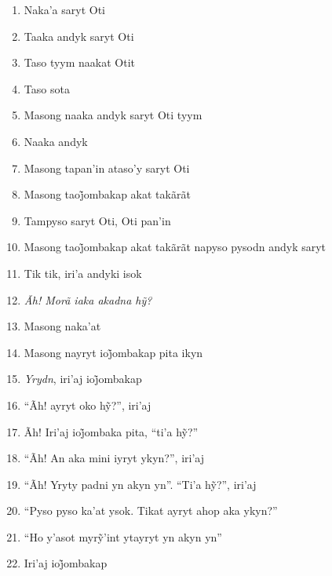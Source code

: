 \begin{enumerate}
 \item Naka'a saryt Oti
 \item Taaka andyk saryt Oti
 \item Taso tyym naakat Otit
 \item Taso sota

 \begin{center}\end{center}
 
 \item Masong naaka andyk saryt Oti tyym
 \item Naaka andyk
 \item Masong tapan'in ataso'y saryt Oti
 \item Masong taoj̃ombakap akat takãrãt
 \item Tampyso saryt Oti, Oti pan'in

 \begin{center}\end{center}

 \item Masong taoj̃ombakap akat takãrãt napyso pysodn andyk saryt
 \item Tik tik, iri'a andyki isok
 \item \textit{Ãh! Morã iaka akadna hỹ?}
 \item Masong naka'at
 \item Masong nayryt ioj̃ombakap pita ikyn
 \item \textit{Yrydn}, iri’aj ioj̃ombakap
 \item ``Ãh! ayryt oko hỹ?'', iri’aj

 \begin{center}\end{center}

 \item Ãh! Iri’aj ioj̃ombaka pita, ``ti’a hỹ?''
 \item ``Ãh! An aka mini iyryt ykyn?'', iri'aj
 \item ``Ãh! Yryty padni yn akyn yn''. ``Ti’a hỹ?'', iri’aj

 \item ``Pyso pyso ka'at ysok. Tikat ayryt ahop aka ykyn?''

 \item ``Ho y’asot myrỹ’int ytayryt yn akyn yn''

 \item Iri’aj ioj̃ombakap

 \begin{center}\end{center}


\end{enumerate}
